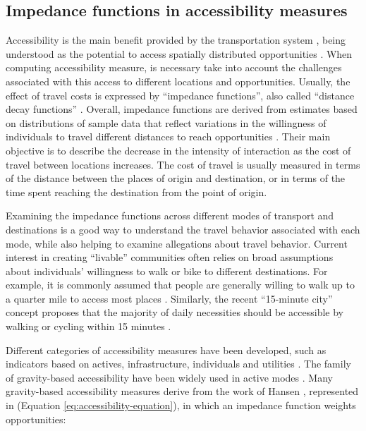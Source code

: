 \documentclass[preprint, 3p,
authoryear]{elsarticle} %
\begin{document}
\subsection{Impedance functions in accessibility
measures}\label{impedance-functions-in-accessibility-measures}

Accessibility is the main benefit provided by the transportation system
\citep{pereira2017}, being understood as the potential to access
spatially distributed opportunities \citep{hansen1959, paez2012}. When
computing accessibility measure, is necessary take into account the
challenges associated with this access to different locations and
opportunities. Usually, the effect of travel costs is expressed by
``impedance functions'', also called ``distance decay functions''
\citep{soukhov2024}. Overall, impedance functions are derived from
estimates based on distributions of sample data that reflect variations
in the willingness of individuals to travel different distances to reach
opportunities \citep{li2020approach}. Their main objective is to
describe the decrease in the intensity of interaction as the cost of
travel between locations increases. The cost of travel is usually
measured in terms of the distance between the places of origin and
destination, or in terms of the time spent reaching the destination from
the point of origin.

Examining the impedance functions across different modes of transport
and destinations is a good way to understand the travel behavior
associated with each mode, while also helping to examine allegations
about travel behavior. Current interest in creating ``livable''
communities often relies on broad assumptions about individuals'
willingness to walk or bike to different destinations. For example, it
is commonly assumed that people are generally willing to walk up to a
quarter mile to access most places \citep{untermann1984, larsen2010}.
Similarly, the recent ``15-minute city'' concept proposes that the
majority of daily necessities should be accessible by walking or cycling
within 15 minutes \citep{moreno2021}.

Different categories of accessibility measures have been developed, such
as indicators based on actives, infrastructure, individuals and
utilities \citep{geurs2004, paez2012}. The family of gravity-based
accessibility have been widely used in active modes \citep{miller2005}.
Many gravity-based accessibility measures derive from the work of Hansen
\citeyearpar{hansen1959}, represented in (Equation
\ref{eq:accessibility-equation}), in which an impedance function weights
opportunities:
\end{document}

